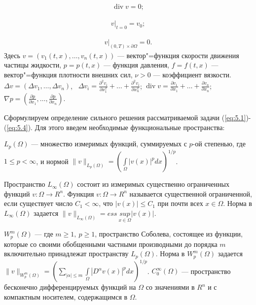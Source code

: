 \begin{equation}\label{eq:5.2}
    \begin{gathered}
        \operatorname{div} v=0;
    \end{gathered}
\end{equation}

\begin{equation}\label{eq:5.3}
    \begin{gathered}
        v|_{t=0}=v_0;
    \end{gathered}
\end{equation}

\begin{equation}\label{eq:5.4}
    \begin{gathered}
        v|_{(0, T)\times\partial\Omega}=0.
    \end{gathered}
\end{equation}
Здесь $v=(v_1(t, x),\ldots,v_n(t, x))$ --- вектор"=функция скорости движения частицы жидкости, $p=p(t, x)$ --- функция давления,
$f=f(t, x)$ --- вектор"=функция плотности внешних сил, $\nu>0$ --- коэффициент вязкости.
$\Delta v=(\Delta v_1,\ldots,\Delta v_n)$, \ $\Delta v_i= \frac{\partial^2 v_i}{\partial x_1^2}+\ldots+\frac{\partial^2 v_i}{\partial x_n^2}$;
$\operatorname{div} v= \frac{\partial v_1}{\partial x_1}+\ldots+\frac{\partial v_n}{\partial x_n}$;
$\nabla p=(\frac{\partial p}{\partial x_1},\ldots,\frac{\partial p}{\partial x_n})$.

Сформулируем определение сильного решения рассматриваемой задачи (\ref{eq:5.1})-(\ref{eq:5.4}).
Для этого введем необходимые функциональные пространства:

$L_p(\Omega)$ --- множество измеримых функций, суммируемых с $p$-ой степенью, где $1\le p< \infty$,
и нормой $\|v\|_{L_p(\Omega)}=(\int\limits_\Omega |v(x)|^pdx)^{1/p}$.

Пространство $L_{\infty}(\Omega)$ состоит из измеримых существенно ограниченных функций $v:\Omega\rightarrow R^n$.
Функция $v:\Omega\rightarrow R^n$ называется существенной ограниченной, если существует число $C_1<\infty$, что $|v(x)|\le C_1$ при почти всех $x\in\Omega$.
Норма в $L_{\infty}(\Omega)$ задается
$\|v\|_{L_{\infty}(\Omega)}=ess \ \underset{x\in\Omega}{sup} |v(x)|$.

$W_p^m(\Omega)$ --- где $m\geqslant 1, \ p\geqslant 1$, пространство Соболева, состоящее из
функции, которые со своими обобщенными частными производными до порядка $m$ включительно принадлежат пространству $L_p(\Omega)$.
Норма в $W_p^m(\Omega)$ задается $\|v\|_{W_p^m(\Omega)}=\left(\sum\limits_{|\alpha|\leqslant m} \int\limits_\Omega |D^{\alpha}v(x)|^pdx\right)^{1/p}$.
\clearpage
$C_0^{\infty}(\Omega)$ --- пространство бесконечно дифференцируемых функций на $\Omega$ со значениями в $R^n$ и с компактным носителем,
содержащимся в $\Omega$.

